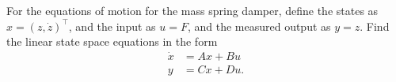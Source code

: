 For the equations of motion for the mass spring damper, define the states as $x=(z,\dot{z})^{\top}$, and the input as $u=F$, and the measured output as $y=z$.  Find the linear state space equations in the form
\begin{align*}
	\dot{x} &= Ax + Bu \\
	y &= Cx + Du.
\end{align*} 
